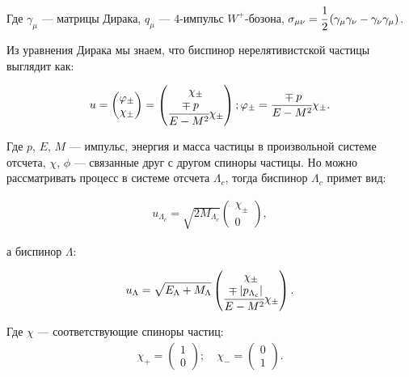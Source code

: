 Где $\gamma_\mu$ --- матрицы Дирака, $q_\mu$ --- 4-импульс $W^+$-бозона,
$\sigma_{\mu\nu} = \cfrac{1}{2} \inner{\gamma_\mu \gamma_\nu - \gamma_\nu \gamma_\mu}$.
 
Из уравнения Дирака мы знаем, что биспинор нерелятивистской частицы выглядит как:
 
\begin{gather}
    u = 
    \begin{pmatrix}
        \phi_\pm \\
        \chi_\pm
    \end{pmatrix}
    =
    \begin{pmatrix}
        \chi_\pm \\
        \cfrac{\mp p}{E - M^2} \chi_\pm
    \end{pmatrix};
    \phi_\pm = \cfrac{\mp p}{E - M^2} \chi_\pm.
\end{gather}
 
Где $p$, $E$, $M$ --- импульс, энергия и масса частицы в произвольной системе отсчета, $\chi$, $\phi$ --- связанные друг с другом спиноры частицы. 
Но можно рассматривать процесс в системе отсчета $\Lambda_c$, 
тогда биспинор $\Lambda_c$ примет вид:
 
\begin{gather}
    u_{\Lambda_c} = \sqrt{2 M_{\Lambda_c}}
    \begin{pmatrix}
        \chi_\pm \\
        0
    \end{pmatrix},
\end{gather}
 
а биспинор $\Lambda$: 
 
\begin{gather}
    u_{\Lambda} = \sqrt{E_{\Lambda} + M_{\Lambda}}
    \begin{pmatrix}
        \chi_\pm \\
        \cfrac{\mp \abs{p_{\Lambda_c}}}{E - M^2} \chi_\pm
    \end{pmatrix}.
\end{gather}
 
Где $\chi$ --- соответствующие спиноры частиц:
\begin{gather}
    \chi_+ = 
    \begin{pmatrix}
        1 \\
        0
    \end{pmatrix}; \quad
    \chi_- = 
    \begin{pmatrix}
        0 \\
        1
    \end{pmatrix}.
\end{gather}
 
